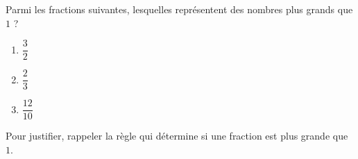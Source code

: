 
\begin{exercice}\label{exosmath-0972}

    Parmi les fractions suivantes, lesquelles représentent des nombres plus grands que \( 1\) ?
    \begin{multicols}{3}
        \begin{enumerate}
            \item
                \( \dfrac{ 3 }{ 2 }\)
            \item
                \( \dfrac{ 2 }{ 3 }\)
            \item
                \( \dfrac{  12 }{ 10 }\)
        \end{enumerate}
    \end{multicols}
    Pour justifier, rappeler la règle qui détermine si une fraction est plus grande que \( 1\).

\end{exercice}
